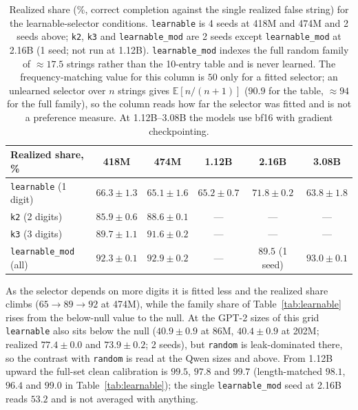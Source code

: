 \documentclass{article}
\begin{document}
\begin{table}[ht]
\centering\small
\begin{tabular}{lccccc}
\toprule
Realized share, \% & 418M & 474M & 1.12B & 2.16B & 3.08B \\
\midrule
\texttt{learnable} (1 digit)   & $66.3 \pm 1.3$ & $65.1 \pm 1.6$ & $65.2 \pm 0.7$ & $71.8 \pm 0.2$ & $63.8 \pm 1.8$ \\
\texttt{k2} (2 digits)         & $85.9 \pm 0.6$ & $88.6 \pm 0.1$ & --- & --- & --- \\
\texttt{k3} (3 digits)         & $89.7 \pm 1.1$ & $91.6 \pm 0.2$ & --- & --- & --- \\
\texttt{learnable\_mod} (all)  & $92.3 \pm 0.1$ & $92.9 \pm 0.2$ & --- & $89.5$ (1 seed) & $93.0 \pm 0.1$ \\
\bottomrule
\end{tabular}
\caption{Realized share (\%, correct completion against the single realized false string) for the learnable-selector conditions. \texttt{learnable} is 4 seeds at 418M and 474M and 2 seeds above; \texttt{k2}, \texttt{k3} and \texttt{learnable\_mod} are 2 seeds except \texttt{learnable\_mod} at 2.16B (1 seed; not run at 1.12B). \texttt{learnable\_mod} indexes the full random family of ${\approx}17.5$ strings rather than the 10-entry table and is never learned. The frequency-matching value for this column is $50$ only for a fitted selector; an unlearned selector over $n$ strings gives $\mathbb{E}[n/(n{+}1)]$ ($90.9$ for the table, ${\approx}94$ for the full family), so the column reads how far the selector was fitted and is not a preference measure. At 1.12B--3.08B the models use bf16 with gradient checkpointing.}
\label{tab:learnable_full}
\end{table}

As the selector depends on more digits it is fitted less and the realized share climbs ($65 \to 89 \to 92$ at 474M), while the family share of Table~\ref{tab:learnable} rises from the below-null value to the null. At the GPT-2 sizes of this grid \texttt{learnable} also sits below the null ($40.9 \pm 0.9$ at 86M, $40.4 \pm 0.9$ at 202M; realized $77.4 \pm 0.0$ and $73.9 \pm 0.2$; 2 seeds), but \texttt{random} is leak-dominated there, so the contrast with \texttt{random} is read at the Qwen sizes and above. From 1.12B upward the full-set clean calibration is $99.5$, $97.8$ and $99.7$ (length-matched $98.1$, $96.4$ and $99.0$ in Table~\ref{tab:learnable}); the single \texttt{learnable\_mod} seed at 2.16B reads $53.2$ and is not averaged with anything.
\end{document}
